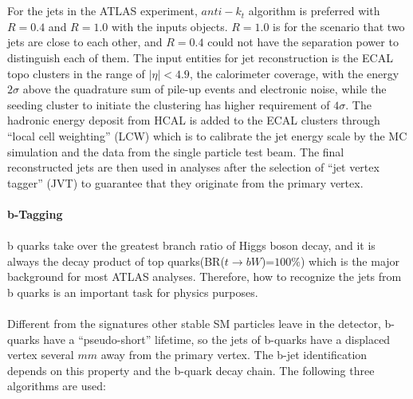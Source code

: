 \\
\\For the jets in the ATLAS experiment, $anti-k_{t}$ algorithm is preferred with $R=0.4$ and $R=1.0$ with the inputs objects. $R=1.0$ is for the scenario that two jets are close to each other, and $R=0.4$ could not have the separation power to distinguish each of them. The input entities for jet reconstruction is the ECAL topo clusters in the range of $|\eta|<4.9$, the calorimeter coverage, with the energy $2\sigma$ above the quadrature sum of pile-up events and electronic noise, while the seeding cluster to initiate the clustering has higher requirement of $4\sigma$. The hadronic energy deposit from HCAL is added to the ECAL clusters through ``local cell weighting'' (LCW)\cite{Barillari:1112035} which is to calibrate the jet energy scale by the MC simulation and the data from the single particle test beam. The final reconstructed jets are then used in analyses after the selection of ``jet vertex tagger'' (JVT)\cite{ATLAS-CONF-2014-018} to guarantee that they originate from the primary vertex. 
\\
\\{\bf b-Tagging\cite{ATL-PHYS-PUB-2015-022}}
\\
\\b quarks take over the greatest branch ratio of Higgs boson decay, and it is always the decay product of top quarks(BR($t \rightarrow bW$)=$100\%$) which is the major background for most ATLAS analyses. Therefore, how to recognize the jets from b quarks is an important task for physics purposes.
\\
\\Different from the signatures other stable SM particles leave in the detector, b-quarks have a ``pseudo-short'' lifetime, so the jets of b-quarks have a displaced vertex several $mm$ away from the primary vertex. The b-jet identification depends on this property and the b-quark decay chain. The following three algorithms are used:
